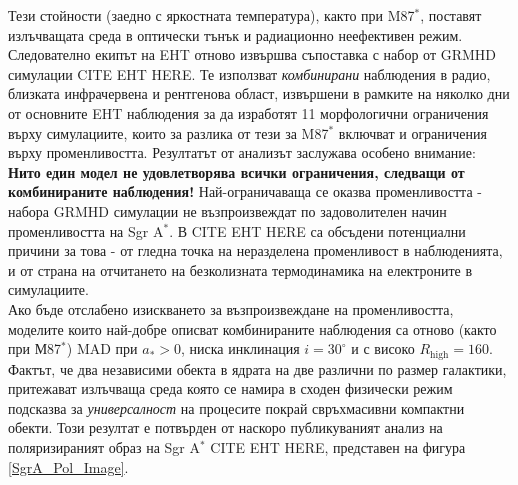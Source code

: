 Тези стойности (заедно с яркостната температура), както при M87$^*$, поставят излъчващата среда в оптически тънък и радиационно неефективен режим. Следователно екипът на EHT отново извършва съпоставка с набор от GRMHD симулации CITE EHT HERE. Те използват \emph{комбинирани} наблюдения в радио, близката инфрачервена и рентгенова област, извършени в рамките на няколко дни от основните EHT наблюдения за да изработят 11 морфологични ограничения върху симулациите, които за разлика от тези за M87$^*$ включват и ограничения върху променливостта. Резултатът от анализът заслужава особено внимание:\\

\textbf{Нито един модел не удовлетворява всички ограничения, следващи от комбинираните наблюдения!} Най-ограничаваща се оказва променливостта - набора GRMHD симулации не възпроизвеждат по задоволителен начин променливостта на Sgr A$^*$. В CITE EHT HERE са обсъдени потенциални причини за това - от гледна точка на неразделена променливост в наблюденията, и от страна на отчитането на безколизната термодинамика на електроните в симулациите.\\\newline
Ако бъде отслабено изискването за възпроизвеждане на променливостта, моделите които най-добре описват комбинираните наблюдения са отново (както при М87$^*$) MAD при $a_*>0$, ниска инклинация $i = 30^\circ$ и с високо $R_\text{high} = 160$. Фактът, че два независими обекта в ядрата на две различни по размер галактики, притежават излъчваща среда която се намира в сходен физически режим подсказва за \emph{универсалност} на процесите покрай свръхмасивни компактни обекти. Този резултат е потвърден от наскоро публикуваният анализ на поляризираният образ на Sgr A$^*$ CITE EHT HERE, представен на фигура \ref{SgrA_Pol_Image}.\\


